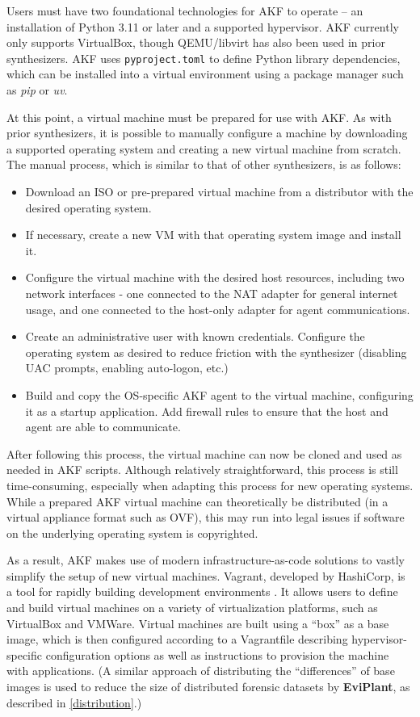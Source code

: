 \documentclass[letterpaper,12pt]{report}
\def\tightlist{}
\newcommand{\passthrough}[1]{#1}
\begin{document}
Users must have two foundational technologies for AKF to operate -- an
installation of Python 3.11 or later and a supported hypervisor. AKF
currently only supports VirtualBox, though QEMU/libvirt has also been
used in prior synthesizers. AKF uses
\passthrough{\lstinline!pyproject.toml!} to define Python library
dependencies, which can be installed into a virtual environment using a
package manager such as \emph{pip} or \emph{uv}.

At this point, a virtual machine must be prepared for use with AKF. As
with prior synthesizers, it is possible to manually configure a machine
by downloading a supported operating system and creating a new virtual
machine from scratch. The manual process, which is similar to that of
other synthesizers, is as follows:

\begin{itemize}
\tightlist
\item
  Download an ISO or pre-prepared virtual machine from a distributor
  with the desired operating system.
\item
  If necessary, create a new VM with that operating system image and
  install it.
\item
  Configure the virtual machine with the desired host resources,
  including two network interfaces - one connected to the NAT adapter
  for general internet usage, and one connected to the host-only adapter
  for agent communications.
\item
  Create an administrative user with known credentials. Configure the
  operating system as desired to reduce friction with the synthesizer
  (disabling UAC prompts, enabling auto-logon, etc.)
\item
  Build and copy the OS-specific AKF agent to the virtual machine,
  configuring it as a startup application. Add firewall rules to ensure
  that the host and agent are able to communicate.
\end{itemize}

After following this process, the virtual machine can now be cloned and
used as needed in AKF scripts. Although relatively straightforward, this
process is still time-consuming, especially when adapting this process
for new operating systems. While a prepared AKF virtual machine can
theoretically be distributed (in a virtual appliance format such as
OVF), this may run into legal issues if software on the underlying
operating system is copyrighted.

As a result, AKF makes use of modern infrastructure-as-code solutions to
vastly simplify the setup of new virtual machines. Vagrant, developed by
HashiCorp, is a tool for rapidly building development environments
\cite{HashicorpVagrant2025}. It allows users to define and build
virtual machines on a variety of virtualization platforms, such as
VirtualBox and VMWare. Virtual machines are built using a ``box'' as a
base image, which is then configured according to a Vagrantfile
describing hypervisor-specific configuration options as well as
instructions to provision the machine with applications. (A similar
approach of distributing the ``differences'' of base images is used to
reduce the size of distributed forensic datasets by \textbf{EviPlant},
as described in \autoref{distribution}.)
\end{document}

